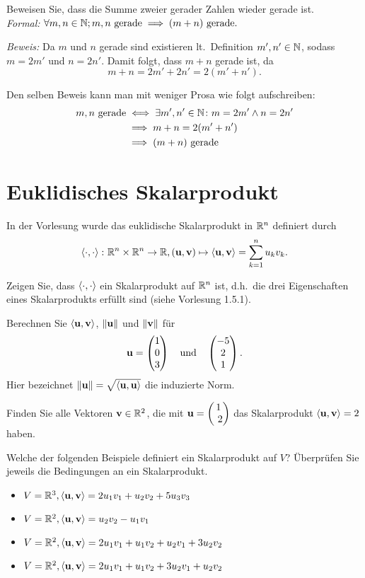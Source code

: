 \documentclass{scrartcl}
\newcommand{\uu}{\mat u}
\newcommand{\vv}{\mat v}
\begin{document}
\begin{solution}[Beispiel]
  Beweisen Sie, dass die Summe zweier gerader Zahlen wieder gerade ist.\\

  \emph{Formal:} $\forall m, n \in \NN; m, n \mbox{ gerade} \implies (m + n) \mbox{ gerade}.$

  \emph{Beweis:} Da $m$ und $n$ gerade sind existieren lt.\ Definition $m', n' \in \NN$, sodass $m = 2m'$ und $n = 2n'$. Damit folgt, dass $m + n$ gerade ist, da
  \[
    m + n = 2m' + 2n' = 2 (m' + n').
  \] 

  Den selben Beweis kann man mit weniger Prosa wie folgt aufschreiben:
  \begin{align*}
    m, n \mbox{ gerade} 
    &\iff \exists m', n' \in \NN\colon m = 2m' \land n = 2n' \\
    &\implies m + n = 2 (m' + n') \\
    &\implies (m + n) \mbox{ gerade}
  \end{align*}
\end{solution}


\section{Euklidisches Skalarprodukt }
In der Vorlesung wurde das euklidische Skalarprodukt in $\RR^n$ definiert durch
\[
  \sp{\cdot}{\cdot} \colon \RR^n \times \RR^n \to \RR, (\uu, \vv) \mapsto \sp{\uu}{\vv} = \sum_{k=1}^n u_k v_k.
\]
\begin{subex}
  \item{} Zeigen Sie, dass $\sp{\cdot}{\cdot}$ ein Skalarprodukt auf $\RR^n$ ist, d.h.\ die drei Eigenschaften eines Skalarprodukts erfüllt sind (siehe Vorlesung 1.5.1).
  \item{} Berechnen Sie $\sp{\uu}{\vv}$, $\norm{\uu}$ und $\norm{\vv}$ für 
  \[
    \uu = \colvec{1 \\ 0 \\ 3} \quad\mbox{und}\quad \colvec{-5 \\ 2 \\ 1}.
  \]
  Hier bezeichnet $\norm{\uu} = \sqrt{\sp{\uu}{\uu}}$ die induzierte Norm.
  \item{} Finden Sie alle Vektoren $\vv \in \RR^2$, die mit $\uu = \colvec{1 \\ 2}$ das Skalarprodukt $\sp{\uu}{\vv} = 2$ haben.  
  \item{} Welche der folgenden Beispiele definiert ein Skalarprodukt auf $V$?
  Überprüfen Sie jeweils die Bedingungen an ein Skalarprodukt.
  \begin{itemize}
    \item $V = \RR^3, \sp{\uu}{\vv} = 2u_1 v_1 +u_2 v_2 +5u_3 v_3$
    \item $V = \RR^2, \sp{\uu}{\vv} = u_2 v_2 - u_1 v_1$
    \item $V =\RR^2, \sp{\uu}{\vv} = 2u_1 v_1 + u_1 v_2 + u_2 v_1 + 3u_2 v_2$
    \item $V =\RR^2, \sp{\uu}{\vv} = 2u_1 v_1 + u_1 v_2 + 3u_2 v_1 + u_2 v_2$
  \end{itemize}
\end{subex}
\end{document}
